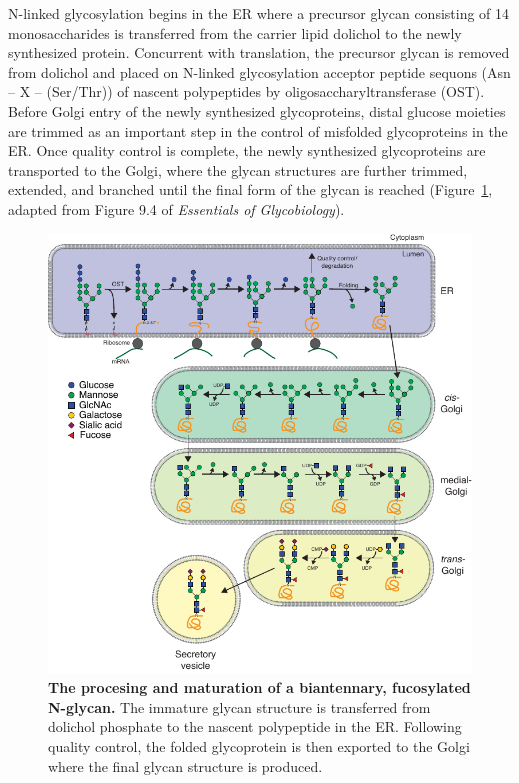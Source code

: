 N-linked glycosylation begins in the ER where a precursor glycan consisting of 14 monosaccharides is transferred from the carrier lipid dolichol to the newly synthesized protein. Concurrent with translation, the precursor glycan is removed from dolichol and placed on N-linked glycosylation acceptor peptide sequons (Asn – X – (Ser/Thr)) of nascent polypeptides by oligosaccharyltransferase (OST)\cite{kornfeld_assembly_1985,lizak_x-ray_2011,ruiz-canada_cotranslational_2009,kelleher_evolving_2006,schreiner_novel_1994,valliere-douglass_glutamine-linked_2010,zielinska_precision_2010}. Before Golgi entry of the newly synthesized glycoproteins, distal glucose moieties are trimmed as an important step in the control of misfolded glycoproteins in the ER\cite{moremen_vertebrate_2012,helenius_roles_2004,lederkremer_glycoprotein_2009}. Once quality control is complete, the newly synthesized glycoproteins are transported to the Golgi, where the glycan structures are further trimmed, extended, and branched until the final form of the glycan is reached (Figure~\ref{fig:ch1fig2}, adapted from Figure 9.4 of \emph{Essentials of Glycobiology}\cite{varki_essentials_2017}).

\begin{figure}
    \includegraphics[keepaspectratio=true,width=\textwidth,height=\textheight]{chapters/chapter1/chapter1_Figure2.pdf}
    \caption{\textbf{The procesing and maturation of a biantennary, fucosylated N-glycan.} The immature glycan structure is transferred from dolichol phosphate to the nascent polypeptide in the ER. Following quality control, the folded glycoprotein is then exported to the Golgi where the final glycan structure is produced.}
    \label{fig:ch1fig2}
\end{figure}

